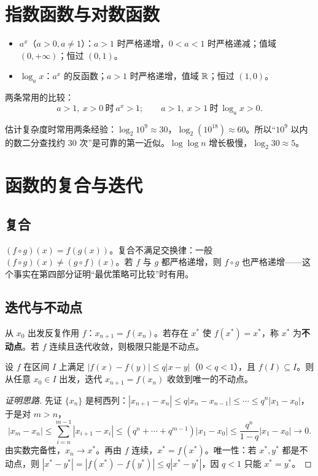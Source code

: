 \section{指数函数与对数函数}
\begin{itemize}
\item $a^x$（$a>0,a\ne1$）：$a>1$ 时严格递增，$0<a<1$ 时严格递减；值域 $(0,+\infty)$；恒过 $(0,1)$。
\item $\log_a x$：$a^x$ 的反函数；$a>1$ 时严格递增，值域 $\mathbb R$；恒过 $(1,0)$。
\end{itemize}
两条常用的比较：
\[
a>1,\ x>0\ \text{时}\ a^x>1;\qquad
a>1,\ x>1\ \text{时}\ \log_a x>0.
\]
\begin{tip}[算法竞赛里的对数]
估计复杂度时常用两条经验：$\log_2 10^9\approx30$，$\log_2(10^{18})\approx60$。所以“$10^9$ 以内的数二分查找约 $30$ 次”是可靠的第一近似。$\log\log n$ 增长极慢，$\log_2 30\approx5$。
\end{tip}

\section{函数的复合与迭代}
\subsection{复合}
$(f\circ g)(x)=f(g(x))$。复合不满足交换律：一般 $(f\circ g)(x)\ne(g\circ f)(x)$。若 $f$ 与 $g$ 都严格递增，则 $f\circ g$ 也严格递增——这个事实在第四部分证明“最优策略可比较”时有用。

\subsection{迭代与不动点}
从 $x_0$ 出发反复作用 $f$：$x_{n+1}=f(x_n)$。若存在 $x^*$ 使 $f(x^*)=x^*$，称 $x^*$ 为\textbf{不动点}。若 $f$ 连续且迭代收敛，则极限只能是不动点。

\begin{theorem}[压缩映射的收敛性]
设 $f$ 在区间 $I$ 上满足 $|f(x)-f(y)|\le q|x-y|$（$0<q<1$），且 $f(I)\subseteq I$。则从任意 $x_0\in I$ 出发，迭代 $x_{n+1}=f(x_n)$ 收敛到唯一的不动点。
\end{theorem}
\begin{proof}[证明思路]
先证 $\{x_n\}$ 是柯西列：$|x_{n+1}-x_n|\le q|x_n-x_{n-1}|\le\cdots\le q^n|x_1-x_0|$，于是对 $m>n$，
\[
|x_m-x_n|\le\sum_{i=n}^{m-1}|x_{i+1}-x_i|
\le(q^n+\cdots+q^{m-1})|x_1-x_0|\le\frac{q^n}{1-q}|x_1-x_0|\to0.
\]
由实数完备性，$x_n\to x^*$。再由 $f$ 连续，$x^*=f(x^*)$。唯一性：若 $x^*,y^*$ 都是不动点，则 $|x^*-y^*|=|f(x^*)-f(y^*)|\le q|x^*-y^*|$，因 $q<1$ 只能 $x^*=y^*$。
\end{proof}

